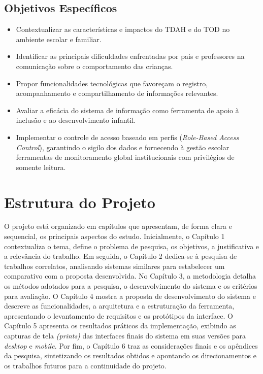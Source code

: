 \vspace{0.3cm}
\subsection{Objetivos Específicos}

\begin{itemize}
    \item Contextualizar as características e impactos do TDAH e do TOD no ambiente escolar e familiar.
    \item Identificar as principais dificuldades enfrentadas por pais e professores na comunicação sobre o comportamento das crianças.
    \item Propor funcionalidades tecnológicas que favoreçam o registro, acompanhamento e compartilhamento de informações relevantes.
    \item Avaliar a eficácia do sistema de informação como ferramenta de apoio à inclusão e ao desenvolvimento infantil.
    \item Implementar o controle de acesso baseado em perfis (\textit{Role-Based Access Control}), garantindo o sigilo dos dados e fornecendo à gestão escolar ferramentas de monitoramento global institucionais com privilégios de somente leitura.
\end{itemize}

\vspace{0.3cm}
\section{Estrutura do Projeto}

O projeto está organizado em capítulos que apresentam, de forma clara e sequencial, os principais aspectos do estudo. Inicialmente, o Capítulo 1 contextualiza o tema, define o problema de pesquisa, os objetivos, a justificativa e a relevância do trabalho. Em seguida, o Capítulo 2 dedica-se à pesquisa de trabalhos correlatos, analisando sistemas similares para estabelecer um comparativo com a proposta desenvolvida. No Capítulo 3, a metodologia detalha os métodos adotados para a pesquisa, o desenvolvimento do sistema e os critérios para avaliação. O Capítulo 4 mostra a proposta de desenvolvimento do sistema e descreve as funcionalidades, a arquitetura e a estruturação da ferramenta, apresentando o levantamento de requisitos e os protótipos da interface. O Capítulo 5 apresenta os resultados práticos da implementação, exibindo as capturas de tela \textit{(prints)} das interfaces finais do sistema em suas versões para \textit{desktop} e \textit{mobile}. Por fim, o Capítulo 6 traz as considerações finais e os apêndices da pesquisa, sintetizando os resultados obtidos e apontando os direcionamentos e os trabalhos futuros para a continuidade do projeto.


